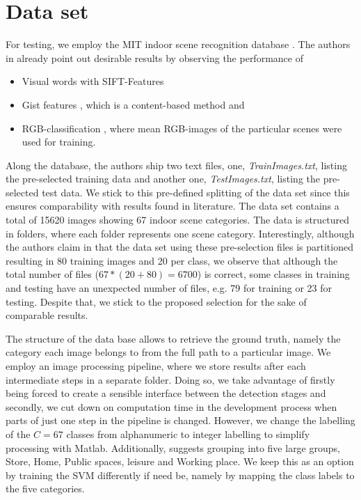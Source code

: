 \documentclass[10pt,twocolumn,letterpaper]{article}
\begin{document}
\section{Data set}
\label{sec:data}
For testing, we employ the MIT indoor scene recognition database \cite{indoorScenes}. The authors in \cite{indoorScenes} already point out desirable results by observing the performance of 
\begin{itemize}
	\item Visual words with SIFT-Features
	\item Gist features \cite{oliva06}, which is a content-based method and
	\item RGB-classification \cite{indoorScenes}, where mean RGB-images of the particular scenes were used for training.
\end{itemize}

Along the database, the authors ship two text files, one, \emph{TrainImages.txt}, listing the pre-selected training data and another one, \emph{TestImages.txt}, listing the pre-selected test data. We stick to this pre-defined splitting of the data set since this ensures comparability with results found in literature. The data set contains a total of 15620 images showing 67 indoor scene categories. The data is structured in folders, where each folder represents one scene category. Interestingly, although the authors claim in \cite{indoorScenes} that the data set using these pre-selection files is partitioned resulting in 80 training images and 20 per class, we observe that although the total number of files ($67*(20+80) = 6700$) is correct, some classes in training and testing have an unexpected number of files, e.g. 79 for training or 23 for testing. Despite that, we stick to the proposed selection for the sake of comparable results.

The structure of the data base allows to retrieve the ground truth, namely the category each image belongs to from the full path to a particular image. We employ an image processing pipeline, where we store results after each intermediate steps in a separate folder. Doing so, we take advantage of firstly being forced to create a sensible interface between the detection stages and secondly, we cut down on computation time in the development process when parts of just one step in the pipeline is changed. However, we change the labelling of the $C=67$ classes from alphanumeric to integer labelling to simplify processing with Matlab. Additionally, \cite{indoorScenes} suggests grouping into five large groups, Store, Home, Public spaces, leisure and Working place. We keep this as an option by training the SVM differently if need be, namely by mapping the class labels to the five categories.
\end{document}
